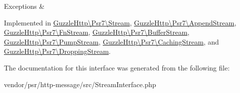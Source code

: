 \begin{DoxyExceptions}{Exceptions}
{\em } & \\
\hline
\end{DoxyExceptions}


Implemented in \hyperlink{classGuzzleHttp_1_1Psr7_1_1Stream_a53602289e59e6b492463c0295211f698}{Guzzle\+Http\textbackslash{}\+Psr7\textbackslash{}\+Stream}, \hyperlink{classGuzzleHttp_1_1Psr7_1_1AppendStream_a59f42807cb0e63251779113dd8d80db2}{Guzzle\+Http\textbackslash{}\+Psr7\textbackslash{}\+Append\+Stream}, \hyperlink{classGuzzleHttp_1_1Psr7_1_1FnStream_ac7198f1b1058da5bde01c2f13b774c56}{Guzzle\+Http\textbackslash{}\+Psr7\textbackslash{}\+Fn\+Stream}, \hyperlink{classGuzzleHttp_1_1Psr7_1_1BufferStream_a2cd1b760c6feef31b410f41940ec708b}{Guzzle\+Http\textbackslash{}\+Psr7\textbackslash{}\+Buffer\+Stream}, \hyperlink{classGuzzleHttp_1_1Psr7_1_1PumpStream_a8684ce6b883e9ba97ee9931c580c61fe}{Guzzle\+Http\textbackslash{}\+Psr7\textbackslash{}\+Pump\+Stream}, \hyperlink{classGuzzleHttp_1_1Psr7_1_1CachingStream_a8a6d9a820f1a4e50bbb965febb5acc36}{Guzzle\+Http\textbackslash{}\+Psr7\textbackslash{}\+Caching\+Stream}, and \hyperlink{classGuzzleHttp_1_1Psr7_1_1DroppingStream_a4c915de6f99be0137ff754d0d3e76e9a}{Guzzle\+Http\textbackslash{}\+Psr7\textbackslash{}\+Dropping\+Stream}.



The documentation for this interface was generated from the following file\+:\begin{DoxyCompactItemize}
\item 
vendor/psr/http-\/message/src/Stream\+Interface.\+php\end{DoxyCompactItemize}
